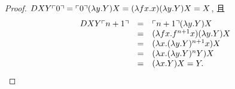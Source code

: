 \begin{proof}
     $D XY\ulcorner{0}\urcorner = \ulcorner{0}\urcorner (\lambda y. Y) X = (\lambda fx. x) (\lambda y.Y) X = X$, 且
 \[
\begin{array}{rcl}
 DXY\ulcorner{n+1}\urcorner & = &
  \ulcorner{n+1}\urcorner (\lambda y. Y) X \\
  &=& (\lambda fx. f^{n+1} x)(\lambda y.Y) X \\
  &=& (\lambda x. (\lambda y.Y)^{n+1} x) X \\ 
  &=& (\lambda x. (\lambda y.Y)^n Y)X \\
  &=& (\lambda x. Y)X = Y.\\
\end{array}
  \]
\end{proof}